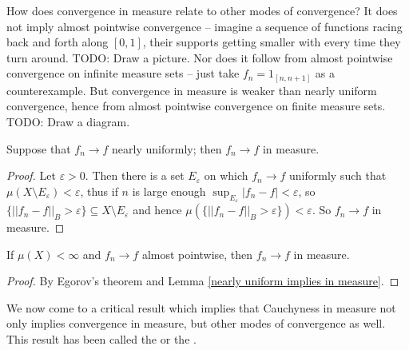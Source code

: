 \begin{subsec}
How does convergence in measure relate to other modes of convergence?
It does not imply almost pointwise convergence -- imagine a sequence of functions racing back and forth along $[0, 1]$, their supports getting smaller with every time they turn around. TODO: Draw a picture.
Nor does it follow from almost pointwise convergence on infinite measure sets -- just take $f_{n} = 1_{[n, n+1]}$ as a counterexample.
But convergence in measure is weaker than nearly uniform convergence, hence from almost pointwise convergence on finite measure sets. TODO: Draw a diagram.
\end{subsec}

\begin{lemma}
\label{nearly uniform implies in measure}
Suppose that $f_{n} \to f$ nearly uniformly; then $f_{n} \to f$ in measure.
\end{lemma}
\begin{proof}
Let $\varepsilon > 0$.
Then there is a set $E_\varepsilon$ on which $f_{n} \to f$ uniformly such that $\mu(X \setminus E_\varepsilon) < \varepsilon$, thus if $n$ is large enough $\sup_{E_\varepsilon} |f_{n} - f| < \varepsilon$, so $\{||f_{n} - f||_{B} > \varepsilon\} \subseteq X \setminus E_\varepsilon$ and hence $\mu(\{||f_{n} - f||_{B} > \varepsilon\}) < \varepsilon$.
So $f_{n} \to f$ in measure.
\end{proof}

\begin{corollary}
If $\mu(X) < \infty$ and $f_{n} \to f$ almost pointwise, then $f_{n} \to f$ in measure.
\end{corollary}
\begin{proof}
By Egorov's theorem and Lemma \ref{nearly uniform implies in measure}.
\end{proof}

\begin{subsec}
We now come to a critical result which implies that Cauchyness in measure not only implies convergence in measure, but other modes of convergence as well.
This result has been called the  or the .
\end{subsec}


